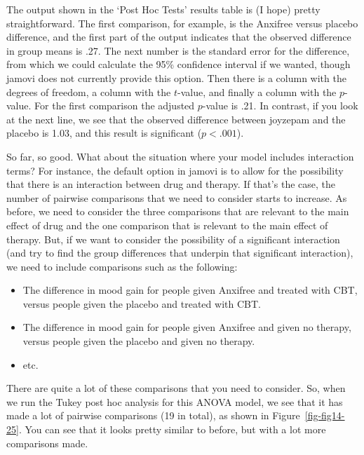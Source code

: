 \documentclass[
  a4paper,
]{book}
\providecommand{\tightlist}{%
  \setlength{\itemsep}{0pt}\setlength{\parskip}{0pt}}\usepackage{longtable,booktabs,array}
\begin{document}
The output shown in the `Post Hoc Tests' results table is (I hope)
pretty straightforward. The first comparison, for example, is the
Anxifree versus placebo difference, and the first part of the output
indicates that the observed difference in group means is .27. The next
number is the standard error for the difference, from which we could
calculate the 95\% confidence interval if we wanted, though jamovi does
not currently provide this option. Then there is a column with the
degrees of freedom, a column with the \(t\)-value, and finally a column
with the \(p\)-value. For the first comparison the adjusted \(p\)-value
is .21. In contrast, if you look at the next line, we see that the
observed difference between joyzepam and the placebo is 1.03, and this
result is significant (\(p < .001\)).

So far, so good. What about the situation where your model includes
interaction terms? For instance, the default option in jamovi is to
allow for the possibility that there is an interaction between drug and
therapy. If that's the case, the number of pairwise comparisons that we
need to consider starts to increase. As before, we need to consider the
three comparisons that are relevant to the main effect of drug and the
one comparison that is relevant to the main effect of therapy. But, if
we want to consider the possibility of a significant interaction (and
try to find the group differences that underpin that significant
interaction), we need to include comparisons such as the following:

\begin{itemize}
\tightlist
\item
  The difference in mood gain for people given Anxifree and treated with
  CBT, versus people given the placebo and treated with CBT.
\item
  The difference in mood gain for people given Anxifree and given no
  therapy, versus people given the placebo and given no therapy.
\item
  etc.
\end{itemize}

There are quite a lot of these comparisons that you need to consider.
So, when we run the Tukey post hoc analysis for this ANOVA model, we see
that it has made a lot of pairwise comparisons (19 in total), as shown
in Figure~\ref{fig-fig14-25}. You can see that it looks pretty similar
to before, but with a lot more comparisons made.
\end{document}
